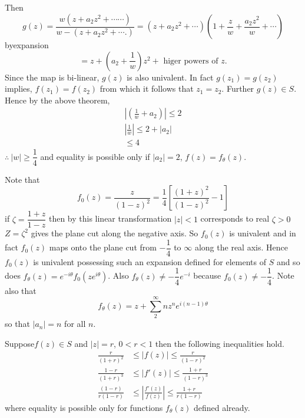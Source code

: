 Then
$$
g(z)=\frac{w(z+a_{2}z^{2}+\cdots\cdots)}{w-(z+a_{2}z^{2}+\cdots.)}=(z+a_{2}z^{2}+\cdots)\left(1+\frac{z}{w}+\frac{a_{2}z^{2}}{w}+\cdots\right)
$$
by\pageoriginale expansion
$$
=z+\left(a_{2}+\frac{1}{w}\right)z^{2}+\text{ higer powers of } z.
$$
Since the map is bi-linear, $g(z)$ is also univalent. In fact
$g(z_{1})=g(z_{2})$ implies, $f(z_{1})=f(z_{2})$ from which it follows
that $z_{1}=z_{2}$. Further $g(z)\in S$. Hence by the above theorem,
\begin{gather*}
\left|\left(\frac{1}{w}+a_{2}\right)\right|\leq 2\\
\left|\frac{1}{w}\right|\leq 2+|a_{2}|\\
\leq 4
\end{gather*}
$\therefore \ |w|\geq \dfrac{1}{4}$ and equality is possible only if
$|a_{2}|=2$, \ie $f(z)=f_{\theta}(z)$.

Note that
$$
f_{0}(z)=\frac{z}{(1-z)^{2}}=\frac{1}{4}\left[\frac{(1+z)^{2}}{(1-z)^{2}}-1\right] 
$$ 
if $\zeta=\dfrac{1+z}{1-z}$ then by this linear transformation $|z|<1$
corresponds to real $\zeta>0$ \iec $Z=\zeta^{2}$ gives the plane cut
along the negative axis. So $f_{0}(z)$ is univalent and in fact
$f_{0}(z)$ maps onto the plane cut from $-\dfrac{1}{4}$ to $\infty$
along the real axis. Hence $f_{0}(z)$ is univalent possessing such an
expansion defined for elements of $S$ and so does
$f_{\theta}(z)=e^{-i\theta}f_{0}(ze^{i\theta})$. Also
$f_{\theta}(z)\neq -\dfrac{1}{4}e^{-i}$ because $f_{0}(z)\neq
-\dfrac{1}{4}$. Note also that
$$
f_{\theta}(z)=z+\sum^{\infty}_{2}nz^{n}e^{i(n-1)\theta}
$$
so that $|a_{n}|=n$ for all $n$.

\begin{thm}\label{part3-thm3}
Suppose\pageoriginale $f(z)\in S$ and $|z|=r$, $0<r<1$ then the following
inequalities hold.
\begin{align*}
\frac{r}{(1+r)^{2}} &\leq |f(z)|\leq \frac{r}{(1-r)^{2}}\\
\frac{1-r}{(1+r)^{3}} &\leq |f'(z)|\leq \frac{1+r}{(1-r)^{3}}\\
\frac{(1-r)}{r(1-r)} &\leq \left|\frac{f'(z)}{f(z)}\right| \leq
\frac{1+r}{r(1-r)} 
\end{align*}
where equality is possible only for functions $f_{\theta}(z)$ defined
already. 
\end{thm}

